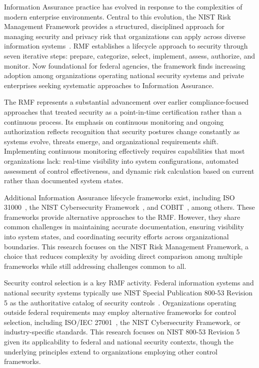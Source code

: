 Information Assurance practice has evolved in response to the complexities of modern enterprise environments. Central to this evolution, the NIST Risk Management Framework provides a structured, disciplined approach for managing security and privacy risk that organizations can apply across diverse information systems~\parencite{Force_2020}. RMF establishes a lifecycle approach to security through seven iterative steps: prepare, categorize, select, implement, assess, authorize, and monitor. Now foundational for federal agencies, the framework finds increasing adoption among organizations operating national security systems and private enterprises seeking systematic approaches to Information Assurance.

The RMF represents a substantial advancement over earlier compliance-focused approaches that treated security as a point-in-time certification rather than a continuous process. Its emphasis on continuous monitoring and ongoing authorization reflects recognition that security postures change constantly as systems evolve, threats emerge, and organizational requirements shift. Implementing continuous monitoring effectively requires capabilities that most organizations lack: real-time visibility into system configurations, automated assessment of control effectiveness, and dynamic risk calculation based on current rather than documented system states.

Additional Information Assurance lifecycle frameworks exist, including ISO 31000~\parencite{for_2018}, the NIST Cybersecurity Framework~\parencite{Cybersecurity_Framework_2013}, and COBIT~\parencite{ISACA2019COBIT}, among others. These frameworks provide alternative approaches to the RMF\@. However, they share common challenges in maintaining accurate documentation, ensuring visibility into system states, and coordinating security efforts across organizational boundaries. This research focuses on the NIST Risk Management Framework, a choice that reduces complexity by avoiding direct comparison among multiple frameworks while still addressing challenges common to all.

Security control selection is a key RMF activity. Federal information systems and national security systems typically use NIST Special Publication 800-53 Revision 5 as the authoritative catalog of security controls~\parencite{Force_2020}. Organizations operating outside federal requirements may employ alternative frameworks for control selection, including ISO/IEC 27001~\parencite{ISO27001-2023}, the NIST Cybersecurity Framework, or industry-specific standards. This research focuses on NIST 800-53 Revision 5 given its applicability to federal and national security contexts, though the underlying principles extend to organizations employing other control frameworks.

